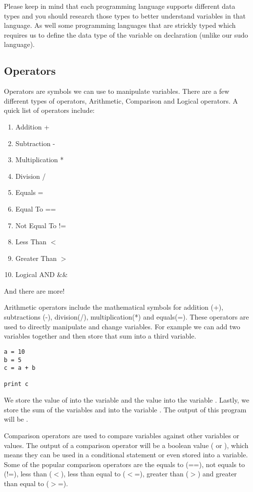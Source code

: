 Please keep in mind that each programming language supports different data types and you should research those types to better
understand variables in that language.
As well some programming languages that are strickly typed which requires us to define the data type of the
variable on declaration (unlike our sudo language).


\subsection{Operators}
Operators are symbols we can use to manipulate variables.
There are a few different types of operators, Arithmetic, Comparison and Logical operators.
A quick list of operators include:

\begin{enumerate}
\item Addition +
\item Subtraction -
\item Multiplication *
\item Division /
\item Equals =
\item Equal To ==
\item Not Equal To !=
\item Less Than $<$
\item Greater Than $>$ 
\item Logical AND \&\&
\end{enumerate}

And there are more!
\par

Arithmetic operators include the mathematical symbols for addition (+), subtractions (-), division(/), multiplication(*) and equals(=).
These operators are used to directly manipulate and change variables.
For example we can add two variables together and then store that sum into a third variable.

\begin{lstlisting}[caption={Addition Operator}]
a = 10
b = 5
c = a + b

print c
\end{lstlisting}

We store the value of  into the variable  and the value  into the variable .
Lastly, we store the sum of the variables  and  into the variable .
The output of this program will be .
\par

Comparison operators are used to compare variables against other variables or values.
The output of a comparison operator will be a boolean value ( or ), which means they can be used in a conditional statement or even stored into a variable.
Some of the popular comparison operators are the equals to (==), not equals to (!=), less than ($<$), less than equal to ($<$=), greater than ($>$) and greater than equal to ($>$=).

